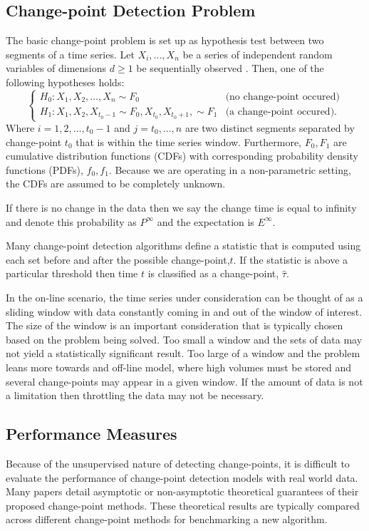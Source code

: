\subsection{Change-point Detection Problem}
The basic change-point problem is set up as hypothesis test between two segments of a time series. Let $X_i,...,X_n$ be a series of independent random variables of dimensions $d \geq 1$ be sequentially observed . Then, one of the following hypotheses holds:
\begin{equation}
  \begin{cases}
    H_0: X_1, X_2, ...,X_n \sim  F_0 & \text{(no change-point occured)} \\
    H_1: X_1,X_2, X_{t_0-1} \sim F_0, X_{t_0}, X_{t_0+1},  \sim F_1 & \text{(a change-point occured)}. 
  \end{cases}
\end{equation}
Where $i=1,2,...,t_0-1$ and $j=t_0,...,n$  are two distinct segments separated by change-point $t_0$ that is within the time series window. Furthermore, $F_0, F_1$ are cumulative distribution functions (CDFs) with corresponding probability density functions (PDFs), $f_0, f_1$. Because we are operating in a non-parametric setting, the CDFs are assumed to be completely unknown. 

If there is no change in the data then we say the change time is equal to infinity and denote this probability as $P^{\infty}$ and the expectation is $E^{\infty}$.

Many change-point detection algorithms define a statistic that is computed using each set before and after the possible change-point,$t$. If the statistic is above a particular threshold then time $t$ is classified as a change-point, $\hat{\tau}$.

In the on-line scenario, the time series under consideration can be thought of as a sliding window with data constantly coming in and out of the window of interest. The size of the window is an important consideration that is typically chosen based on the problem being solved. Too small a window and the sets of data may not yield a statistically significant result. Too large of a window and the problem leans more towards and off-line model, where high volumes must be stored and several change-points may appear in a given window. If the amount of data is not a limitation then throttling the data may not be necessary.

\subsection{Performance Measures}
Because of the unsupervised nature of detecting change-points, it is difficult to evaluate the performance of change-point detection models with real world data. Many papers detail asymptotic or non-asymptotic theoretical guarantees of their proposed change-point methods.  These theoretical results are typically compared across different change-point methods for benchmarking a new algorithm.

